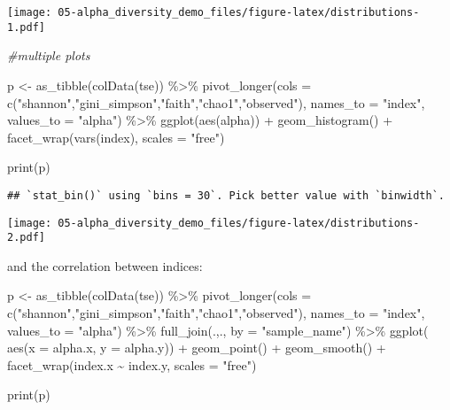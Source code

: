 \documentclass[
  oneside]{book}
\newenvironment{Shaded}{\begin{snugshade}}{\end{snugshade}}
\newcommand{\AttributeTok}[1]{\textcolor[rgb]{0.77,0.63,0.00}{#1}}
\newcommand{\CommentTok}[1]{\textcolor[rgb]{0.56,0.35,0.01}{\textit{#1}}}
\newcommand{\FunctionTok}[1]{\textcolor[rgb]{0.00,0.00,0.00}{#1}}
\newcommand{\NormalTok}[1]{#1}
\newcommand{\OtherTok}[1]{\textcolor[rgb]{0.56,0.35,0.01}{#1}}
\newcommand{\SpecialCharTok}[1]{\textcolor[rgb]{0.00,0.00,0.00}{#1}}
\newcommand{\StringTok}[1]{\textcolor[rgb]{0.31,0.60,0.02}{#1}}
\begin{document}
\texttt{[image: 05-alpha\_diversity\_demo\_files/figure-latex/distributions-1.pdf]}

\begin{Shaded}
\begin{Highlighting}[]
\CommentTok{\#multiple plots}

\NormalTok{p }\OtherTok{\textless{}{-}} \FunctionTok{as\_tibble}\NormalTok{(}\FunctionTok{colData}\NormalTok{(tse)) }\SpecialCharTok{\%\textgreater{}\%} 
  \FunctionTok{pivot\_longer}\NormalTok{(}\AttributeTok{cols =} \FunctionTok{c}\NormalTok{(}\StringTok{"shannon"}\NormalTok{,}\StringTok{"gini\_simpson"}\NormalTok{,}\StringTok{"faith"}\NormalTok{,}\StringTok{"chao1"}\NormalTok{,}\StringTok{"observed"}\NormalTok{), }\AttributeTok{names\_to =} \StringTok{"index"}\NormalTok{, }\AttributeTok{values\_to =} \StringTok{"alpha"}\NormalTok{) }\SpecialCharTok{\%\textgreater{}\%} 
  \FunctionTok{ggplot}\NormalTok{(}\FunctionTok{aes}\NormalTok{(alpha)) }\SpecialCharTok{+}
  \FunctionTok{geom\_histogram}\NormalTok{() }\SpecialCharTok{+}
  \FunctionTok{facet\_wrap}\NormalTok{(}\FunctionTok{vars}\NormalTok{(index), }\AttributeTok{scales =} \StringTok{"free"}\NormalTok{)}


\FunctionTok{print}\NormalTok{(p)}
\end{Highlighting}
\end{Shaded}

\begin{verbatim}
## `stat_bin()` using `bins = 30`. Pick better value with `binwidth`.
\end{verbatim}

\texttt{[image: 05-alpha\_diversity\_demo\_files/figure-latex/distributions-2.pdf]}

and the correlation between indices:

\begin{Shaded}
\begin{Highlighting}[]
\NormalTok{p }\OtherTok{\textless{}{-}} \FunctionTok{as\_tibble}\NormalTok{(}\FunctionTok{colData}\NormalTok{(tse)) }\SpecialCharTok{\%\textgreater{}\%} 
  \FunctionTok{pivot\_longer}\NormalTok{(}\AttributeTok{cols =} \FunctionTok{c}\NormalTok{(}\StringTok{"shannon"}\NormalTok{,}\StringTok{"gini\_simpson"}\NormalTok{,}\StringTok{"faith"}\NormalTok{,}\StringTok{"chao1"}\NormalTok{,}\StringTok{"observed"}\NormalTok{), }\AttributeTok{names\_to =} \StringTok{"index"}\NormalTok{, }\AttributeTok{values\_to =} \StringTok{"alpha"}\NormalTok{) }\SpecialCharTok{\%\textgreater{}\%} 
  \FunctionTok{full\_join}\NormalTok{(.,., }\AttributeTok{by =} \StringTok{"sample\_name"}\NormalTok{) }\SpecialCharTok{\%\textgreater{}\%} 
  \FunctionTok{ggplot}\NormalTok{( }\FunctionTok{aes}\NormalTok{(}\AttributeTok{x =}\NormalTok{ alpha.x, }\AttributeTok{y =}\NormalTok{ alpha.y)) }\SpecialCharTok{+} 
  \FunctionTok{geom\_point}\NormalTok{() }\SpecialCharTok{+}
  \FunctionTok{geom\_smooth}\NormalTok{() }\SpecialCharTok{+}
  \FunctionTok{facet\_wrap}\NormalTok{(index.x }\SpecialCharTok{\textasciitilde{}}\NormalTok{ index.y, }\AttributeTok{scales =} \StringTok{"free"}\NormalTok{)}

\FunctionTok{print}\NormalTok{(p)}
\end{Highlighting}
\end{Shaded}
\end{document}
